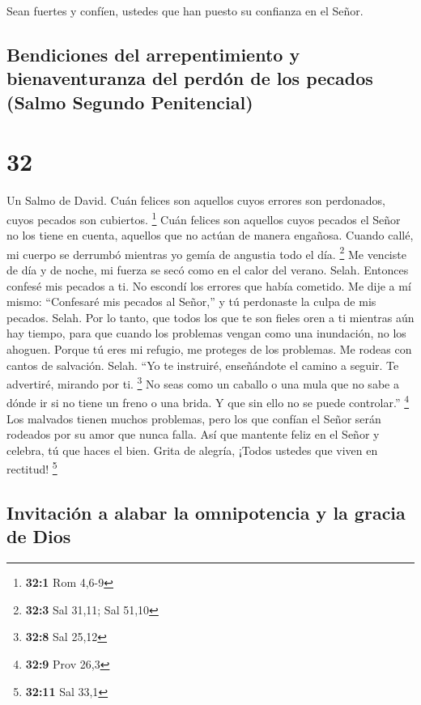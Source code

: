  Sean fuertes y confíen, ustedes que han puesto su
confianza en el Señor.

\hypertarget{bendiciones-del-arrepentimiento-y-bienaventuranza-del-perduxf3n-de-los-pecados-salmo-segundo-penitencial}{%
\subsection{Bendiciones del arrepentimiento y bienaventuranza del perdón
de los pecados (Salmo Segundo
Penitencial)}\label{bendiciones-del-arrepentimiento-y-bienaventuranza-del-perduxf3n-de-los-pecados-salmo-segundo-penitencial}}

\hypertarget{section-31}{%
\section{32}\label{section-31}}

Un Salmo de David.  Cuán felices son aquellos cuyos errores
son perdonados, cuyos pecados son cubiertos. \footnote{\textbf{32:1} Rom
  4,6-9}  Cuán felices son aquellos cuyos pecados el Señor
no los tiene en cuenta, aquellos que no actúan de manera engañosa.
 Cuando callé, mi cuerpo se derrumbó mientras yo gemía de
angustia todo el día. \footnote{\textbf{32:3} Sal 31,11; Sal 51,10}
 Me venciste de día y de noche, mi fuerza se secó como en el
calor del verano. Selah.  Entonces confesé mis pecados a ti.
No escondí los errores que había cometido. Me dije a mí mismo:
``Confesaré mis pecados al Señor,'' y tú perdonaste la culpa de mis
pecados. Selah.  Por lo tanto, que todos los que te son
fieles oren a ti mientras aún hay tiempo, para que cuando los problemas
vengan como una inundación, no los ahoguen.  Porque tú eres
mi refugio, me proteges de los problemas. Me rodeas con cantos de
salvación. Selah.  ``Yo te instruiré, enseñándote el camino
a seguir. Te advertiré, mirando por ti. \footnote{\textbf{32:8} Sal
  25,12}  No seas como un caballo o una mula que no sabe a
dónde ir si no tiene un freno o una brida. Y que sin ello no se puede
controlar.'' \footnote{\textbf{32:9} Prov 26,3}  Los
malvados tienen muchos problemas, pero los que confían el Señor serán
rodeados por su amor que nunca falla.  Así que mantente
feliz en el Señor y celebra, tú que haces el bien. Grita de alegría,
¡Todos ustedes que viven en rectitud! \footnote{\textbf{32:11} Sal 33,1}

\hypertarget{invitaciuxf3n-a-alabar-la-omnipotencia-y-la-gracia-de-dios}{%
\subsection{Invitación a alabar la omnipotencia y la gracia de
Dios}\label{invitaciuxf3n-a-alabar-la-omnipotencia-y-la-gracia-de-dios}}

